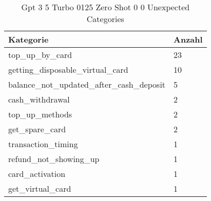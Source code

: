 
    \begin{table}[!ht]
        \centering
        \begin{tabularx}{\textwidth}{X X}
\toprule
\textbf{Kategorie} & \textbf{Anzahl} \\
\midrule
top\_up\_by\_card & \num{23} \\
getting\_disposable\_virtual\_card & \num{10} \\
balance\_not\_updated\_after\_cash\_deposit & \num{5} \\
cash\_withdrawal & \num{2} \\
top\_up\_methods & \num{2} \\
get\_spare\_card & \num{2} \\
transaction\_timing & \num{1} \\
refund\_not\_showing\_up & \num{1} \\
card\_activation & \num{1} \\
get\_virtual\_card & \num{1} \\
\bottomrule
\end{tabularx}

        \caption{Gpt 3 5 Turbo 0125 Zero Shot 0 0 Unexpected Categories}
        \label{tab:gpt-3-5-turbo-0125-zero-shot-0-0-unexpected-categories}
    \end{table}
    